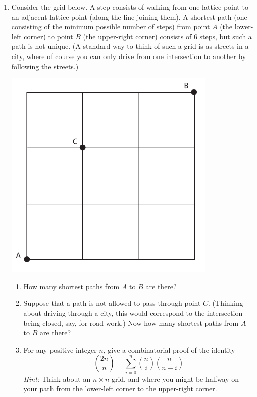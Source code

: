 \documentclass{article}
\begin{document}
\begin{enumerate}
\item Consider the grid below. A step consists of walking from one lattice point to an adjacent lattice point (along the line joining them). A shortest path (one consisting of the minimum possible number of steps) from point $A$ (the lower-left corner) to point $B$ (the upper-right corner) consists of 6 steps, but such a path is not unique. (A standard way to think of such a grid is as streets in a city, where of course you can only drive from one intersection to another by following the streets.)
\bigskip
\bigskip
\begin{center}
 \includegraphics[width=4in]{Drawing1.pdf}
\end{center}

\begin{enumerate}
\item How many shortest paths from $A$ to $B$ are there?
\item Suppose that a path is not allowed to pass through point $C$. (Thinking about driving through a city, this would correspond to the intersection being closed, say, for road work.) Now how many shortest paths from $A$ to $B$ are there?
\item For any positive integer $n$, give a combinatorial proof of the identity
\[
\binom{2n}{n} = \sum_{i=0}^n \binom{n}{i}\binom{n}{n-i}
\]
\emph{Hint:} Think about an $n\times n$ grid, and where you might be halfway on your path from the lower-left corner to the upper-right corner.
\end{enumerate}



\end{enumerate}
\end{document}
